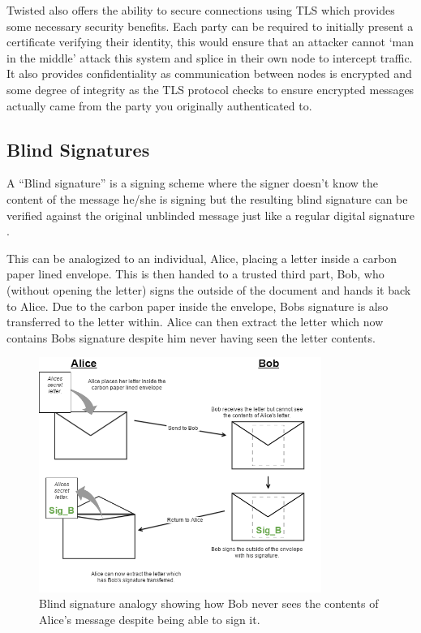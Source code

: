 \documentclass{article}
\begin{document}
Twisted also offers the ability to secure connections using TLS which provides some necessary security benefits. Each party can be required to initially present a certificate verifying their identity, this would ensure that an attacker cannot `man in the middle' attack this system and splice in their own node to intercept traffic. It also provides confidentiality as communication between nodes is encrypted and some degree of integrity as the TLS protocol checks to ensure encrypted messages actually came from the party you originally authenticated to.


\subsection{Blind Signatures}
\label{sec:BlindSignatures}
A ``Blind signature'' is a signing scheme where the signer doesn't know the content of the message he/she is signing but the resulting blind signature can be verified against the original unblinded message just like a regular digital signature \citep{64_ryan_2017}.

	This can be analogized to an individual, Alice, placing a letter inside a carbon paper lined envelope. This is then handed to a trusted third part, Bob, who (without opening the letter) signs the outside of the document and hands it back to Alice. Due to the carbon paper inside the envelope, Bobs signature is also transferred to the letter within. Alice can then extract the letter which now contains Bobs signature despite him never having seen the letter contents.

	\begin{figure}[h]
	\begin{adjustwidth}{0.5cm}{}
	  	\includegraphics[width=0.82\textwidth]{Blind_Signatures}
		\caption{Blind signature analogy showing how Bob never sees the contents of Alice's message despite being able to sign it.}
	\end{adjustwidth}
	\end{figure}
\end{document}
